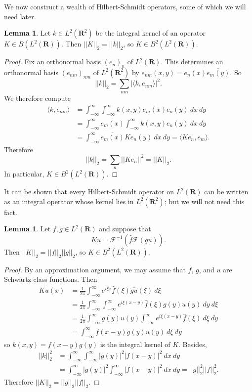 \documentclass[12pt]{report}
\newcommand{\RR}{\mathbf{R}}
\theoremstyle{definition}
\newtheorem{lemma}[theorem]{Lemma}
\begin{document}
We now construct a wealth of Hilbert-Schmidt operators, some of which we will need later.
\begin{lemma}
Let $k \in L^2(\RR^2)$ be the integral kernel of an operator $K \in B(L^2(\RR))$. Then $||K||_2 = ||k||_2$, so $K \in B^2(L^2(\RR))$.
\end{lemma}
\begin{proof}
Fix an orthonormal basis $(e_n)_n$ of $L^2(\RR)$. This determines an orthonormal basis $(e_{nm})_{nm}$ of $L^2(\RR^2)$ by $e_{nm}(x, y) = e_n(x) \overline{e_m(y)}$. So
$$||k||_2 = \sum_{nm} |\langle k, e_{nm}\rangle|^2.$$
We therefore compute
\begin{align*}
  \langle k, e_{nm}\rangle &= \int_{-\infty}^\infty \int_{-\infty}^\infty k(x, y) \overline{e_m(x)} e_n(y) ~dx ~dy\\
  &= \int_{-\infty}^\infty \overline{e_m(x)} \int_{-\infty}^\infty k(x, y) e_n(y) ~dx ~dy\\
  &= \int_{-\infty}^\infty \overline{e_m(x)} Ke_n(y) ~dx ~dy = \langle Ke_n, e_m\rangle.
\end{align*}
Therefore
$$||k||_2 = \sum_n ||Ke_n||^2 = ||K||_2.$$
In particular, $K \in B^2(L^2(\RR))$.
\end{proof}
It can be shown that every Hilbert-Schmidt operator on $L^2(\RR)$ can be written as an integral operator whose kernel lies in $L^2(\RR^2)$; but we will not need this fact.
\begin{lemma}
Let $f, g \in L^2(\RR)$ and suppose that
$$Ku = \mathcal F^{-1}(\hat f \mathcal F(gu)).$$
Then $||K||_2 = ||f||_2||g||_2$, so $K \in B^2(L^2(\RR))$.
\end{lemma}
\begin{proof}
By an approximation argument, we may assume that $f$, $g$, and $u$ are Schwartz-class functions. Then
\begin{align*}
Ku(x) &= \frac{1}{2\pi} \int_{-\infty}^\infty e^{i\xi x} \hat f(\xi) \widehat{gu}(\xi) ~d\xi \\
  &= \frac{1}{2\pi} \int_{-\infty}^\infty \int_{-\infty}^\infty e^{i\xi(x - y)} \hat f(\xi) g(y) u(y) ~dy ~d\xi\\
  &= \frac{1}{2\pi} \int_{-\infty}^\infty g(y)u(y) \int_{-\infty}^\infty e^{i\xi(x - y)} \hat f(\xi) ~d\xi ~dy\\
  &= \int_{-\infty}^\infty f(x - y) g(y) u(y) ~d\xi~dy
\end{align*}
so $k(x, y) = f(x - y) g(y)$ is the integral kernel of $K$. Besides,
\begin{align*}
  ||k||_2^2 &= \int_{-\infty}^\infty \int_{-\infty}^\infty |g(y)|^2 |f(x - y)|^2 ~dx ~dy
  \\&= \int_{-\infty}^\infty |g(y)|^2 \int_{-\infty}^\infty |f(x - y)|^2 ~dx ~dy = ||g||_2^2||f||_2^2.
\end{align*}
Therefore $||K||_2 = ||g||_2 ||f||_2$.
\end{proof}
\end{document}

